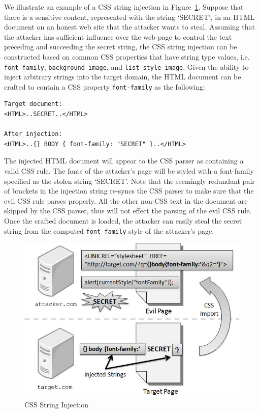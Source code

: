 \documentclass{acm_proc_article-sp}
\begin{document}
We illustrate an example of a CSS string injection in Figure~\ref{figure:injection}. Suppose that there is a sensitive content, represented with the string `SECRET', in an HTML document on an honest web site that the attacker wants to steal. Assuming that the attacker has sufficient influence over the web page to control the text preceding and succeeding the secret string, the CSS string injection can be constructed based on common CSS properties that have string type values, i.e. \texttt{font-family}, \texttt{background-image}, and \texttt{list-style-image}. Given the ability to inject arbitrary strings into the target domain, the HTML document can be crafted to contain a CSS property \texttt{font-family} as the following:
\begin{verbatim}
Target document:
<HTML>..SECRET..</HTML>

After injection:
<HTML>..{} BODY { font-family: "SECRET" }..</HTML>
\end{verbatim}
The injected HTML document will appear to the CSS parser as containing a valid CSS rule. The fonts of the attacker's page will be styled with a font-family specified as the stolen string `SECRET'. Note that the seemingly redundant pair of brackets in the injection string re-syncs the CSS parser to make sure that the evil CSS rule parses properly. All the other non-CSS text in the document are skipped by the CSS parser, thus will not effect the parsing of the evil CSS rule. Once the crafted document is loaded, the attacker can easily steal the secret string from the computed \texttt{font-family} style of the attacker's page.

\begin{figure}
\centering
\includegraphics[width=\linewidth]{injection.jpg}
\caption{CSS String Injection}
\label{figure:injection}
\end{figure}
\end{document}
